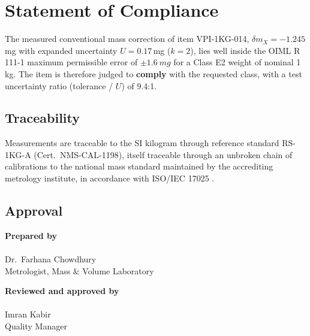 \section{Statement of Compliance}

The measured conventional mass correction of item VPI-1KG-014,
$\delta m_X = -1.245$\,mg with expanded uncertainty $U = 0.17$\,mg
($k = 2$), lies well inside the OIML R 111-1 maximum permissible error of
$\pm\SI{1.6}{mg}$ for a Class E2 weight of nominal 1\,kg. The item is
therefore judged to \textbf{comply} with the requested class, with a
test uncertainty ratio (tolerance / $U$) of 9.4:1.

\subsection{Traceability}
Measurements are traceable to the SI kilogram through reference standard
RS-1KG-A (Cert.\ NMS-CAL-1198), itself traceable through an unbroken chain
of calibrations to the national mass standard maintained by the accrediting
metrology institute, in accordance with ISO/IEC 17025 \cite{iso17025}.

\subsection{Approval}
\vspace{4pt}
\begin{minipage}[t]{0.48\linewidth}
  \textbf{Prepared by} \\[18pt]
  \hrulefill \\
  Dr.\ Farhana Chowdhury \\
  Metrologist, Mass \& Volume Laboratory
\end{minipage}\hfill
\begin{minipage}[t]{0.48\linewidth}
  \textbf{Reviewed and approved by} \\[18pt]
  \hrulefill \\
  Imran Kabir \\
  Quality Manager
\end{minipage}

\vspace{10pt}
